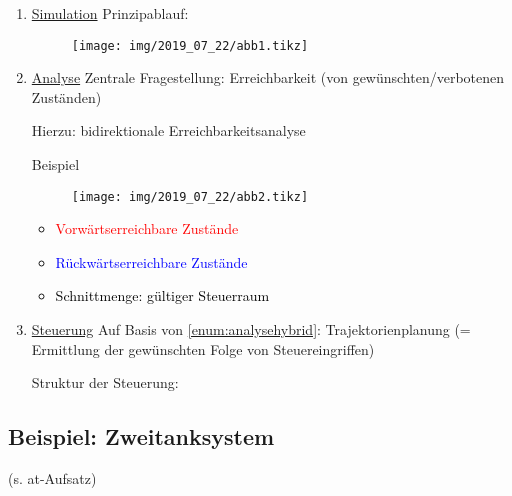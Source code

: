 \begin{enumerate}
	\item \underline{Simulation}
	Prinzipablauf:
	\begin{figure}[H]
		\centering
		\texttt{[image: img/2019\_07\_22/abb1.tikz]}
	\end{figure}
	
	\item \underline{Analyse} \label{enum:analysehybrid}
	Zentrale Fragestellung: Erreichbarkeit (von gewünschten/verbotenen Zuständen)
	
	Hierzu: bidirektionale Erreichbarkeitsanalyse 
	
	Beispiel
	\begin{figure}[H]
		\centering
		\texttt{[image: img/2019\_07\_22/abb2.tikz]}
	\end{figure}
	\begin{itemize}
		\item \textcolor{red}{Vorwärtserreichbare Zustände}
		\item \textcolor{blue}{Rückwärtserreichbare Zustände}
		\item \textcolor{black}{Schnittmenge: gültiger Steuerraum}
	\end{itemize}
	
	
	\item \underline{Steuerung}
	Auf Basis von \ref{enum:analysehybrid}: Trajektorienplanung (= Ermittlung der gewünschten Folge von Steuereingriffen)
	
	Struktur der Steuerung: 
\end{enumerate}

\subsection{Beispiel: Zweitanksystem}
(s. at-Aufsatz)


